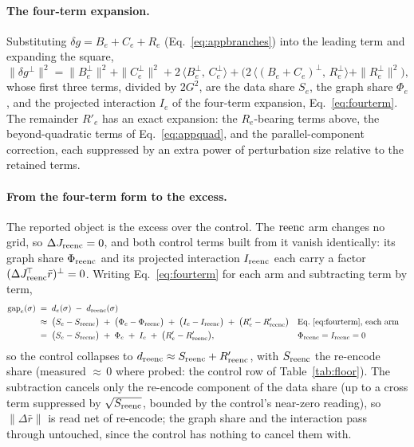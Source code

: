 \paragraph{The four-term expansion.} Substituting
$\delta g = B_e + C_e + R_e$ (Eq.~\ref{eq:appbranches}) into the leading
term and expanding the square,
\begin{equation*}
\|\delta g^{\perp}\|^2
= \|B_e^{\perp}\|^2 + \|C_e^{\perp}\|^2
+ 2\,\langle B_e^{\perp},\, C_e^{\perp}\rangle
+ \Big(2\,\langle (B_e{+}C_e)^{\perp},\, R_e^{\perp}\rangle
+ \|R_e^{\perp}\|^2\Big),
\end{equation*}
whose first three terms, divided by $2G^2$, are the data share $S_e$,
the graph share $\Phi_e$, and the projected interaction $I_e$ of the
four-term expansion, Eq.~\ref{eq:fourterm}. The remainder
$R'_e$ has an exact expansion: the
$R_e$-bearing terms above, the beyond-quadratic terms of
Eq.~\ref{eq:appquad}, and the parallel-component correction, each
suppressed by an extra power of perturbation size relative to the
retained terms.

\paragraph{From the four-term form to the excess.} The reported object
is the excess over the control. The $\mathrm{reenc}$ arm changes no grid, so
$\Delta J_{\mathrm{reenc}} = 0$, and both control terms built from it vanish
identically: its graph share $\Phi_{\mathrm{reenc}}$ and its projected
interaction $I_{\mathrm{reenc}}$ each carry a factor
$(\Delta J_{\mathrm{reenc}}^{\!\top}\bar r)^{\perp} = 0$. Writing
Eq.~\ref{eq:fourterm} for each arm and subtracting term by term,
\begin{align*}
\mathrm{gap}_e(\sigma)
\;&=\; d_e(\sigma) \;-\; d_{\mathrm{reenc}}(\sigma)\\
&\approx\;
\big(S_e - S_{\mathrm{reenc}}\big) \;+\; \big(\Phi_e - \Phi_{\mathrm{reenc}}\big)
\;+\; \big(I_e - I_{\mathrm{reenc}}\big) \;+\; \big(R'_e - R'_{\mathrm{reenc}}\big)
&&\text{Eq.~\ref{eq:fourterm}, each arm}\\
&=\;
\big(S_e - S_{\mathrm{reenc}}\big) \;+\; \Phi_e \;+\; I_e
\;+\; \big(R'_e - R'_{\mathrm{reenc}}\big),
&&\Phi_{\mathrm{reenc}} = I_{\mathrm{reenc}} = 0
\end{align*}
so the control collapses to
$d_{\mathrm{reenc}} \approx S_{\mathrm{reenc}} + R'_{\mathrm{reenc}}$, with $S_{\mathrm{reenc}}$ the
re-encode share (measured ${\approx}\,0$ where probed: the control row
of Table~\ref{tab:floor}). The subtraction cancels only the re-encode
component of the data share (up to a cross term suppressed by
$\sqrt{S_{\mathrm{reenc}}}$, bounded by the control's near-zero reading), so
$\|\Delta\bar r\|$ is read net of re-encode; the graph share and the
interaction pass through untouched, since the control has nothing to
cancel them with.

